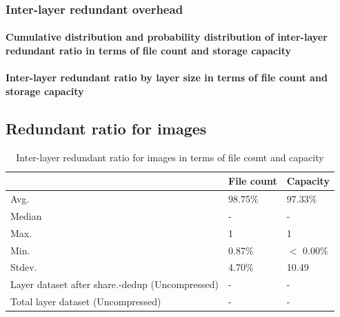 \subsubsection{Inter-layer redundant overhead}

\paragraph{Cumulative distribution and probability distribution of inter-layer redundant ratio in terms of file count and storage capacity}


\paragraph{Inter-layer redundant ratio by layer size in terms of file count and storage capacity}

\subsection{Redundant ratio for images}


\begin{table} 
	\centering 
	\scriptsize  
	\caption{Inter-layer redundant ratio for images in terms of file count and capacity} \label{tbl:across_ratio_layers} 
	\begin{tabular}{|l|l|l|}%
		\hline 
		& File count & Capacity \\
		\hline
		Avg. & 98.75\% & 97.33\%\\
		\hline
		Median & - & - \\
		\hline
		Max. & 1 & 1\\
		\hline
		Min.  & 0.87\%  & $<$ 0.00\%\\
		\hline
		Stdev.  &  4.70\% & 10.49\\
		\hline
		Layer dataset after share.-dedup (Uncompressed) & -  & -\\
		\hline 
		Total layer dataset (Uncompressed) &  -	& -\\
		\hline
	\end{tabular} 
\end{table}

